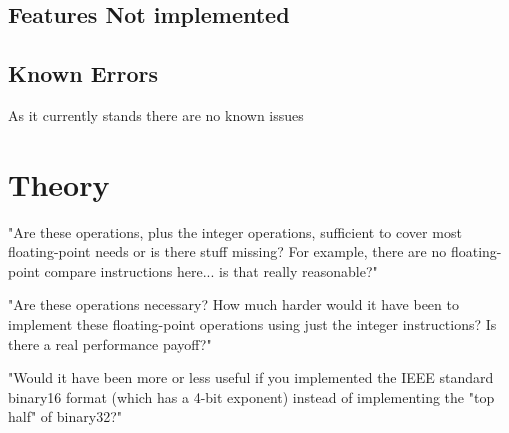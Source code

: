 \documentclass[conference]{IEEEtran}
\begin{document}
\subsection{Features Not implemented}


\subsection{Known Errors}
As it currently stands there are no known issues


\section{Theory}
"Are these operations, plus the integer operations, sufficient to cover most floating-point needs or is there stuff missing? 
For example, there are no floating-point compare instructions here... is that really reasonable?"

"Are these operations necessary? How much harder would it have been to implement these floating-point operations 
using just the integer instructions? Is there a real performance payoff?"

"Would it have been more or less useful if you implemented the IEEE standard binary16 format (which has a 4-bit exponent) 
instead of implementing the "top half" of binary32?"

\end{document}
